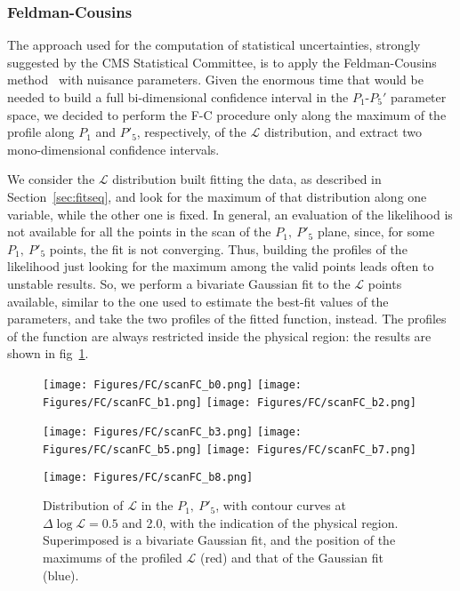 

\subsubsection{Feldman-Cousins}
The approach used for the computation of statistical uncertainties, strongly suggested by the CMS Statistical Committee, is to apply the Feldman-Cousins method~\cite{FC} with nuisance parameters.
Given the enormous time that would be needed to build a full bi-dimensional confidence interval in the $P_1$-$P_5'$ parameter space, we decided to perform the F-C procedure only along the maximum of the profile along $P_1$ and $P'_5$, respectively, of the $\mathcal{L}$ distribution, and extract two mono-dimensional confidence intervals.

We consider the $\mathcal{L}$ distribution built fitting the data, as described in Section~\ref{sec:fitseq}, and look for the maximum of that distribution along one variable, while the other one is fixed.
In general, an evaluation of the likelihood is not available for all the points in the scan of the $P_1,~P'_5$ plane, since, for some $P_1,~P'_5$ points, the fit is not converging.
Thus, building the profiles of the likelihood just looking for the maximum among the valid points leads often to unstable results.
So, we perform a bivariate Gaussian fit to the $\mathcal{L}$ points available, similar to the one used to estimate the best-fit values of the parameters, and take the two profiles of the fitted function, instead.
The profiles of the function are always restricted inside the physical region: the results are shown in fig~\ref{fig:profileL}.

\begin{figure}
  \centering
  \texttt{[image: Figures/FC/scanFC\_b0.png]}
  \texttt{[image: Figures/FC/scanFC\_b1.png]}
  \texttt{[image: Figures/FC/scanFC\_b2.png]}

  \texttt{[image: Figures/FC/scanFC\_b3.png]}
  \texttt{[image: Figures/FC/scanFC\_b5.png]}
  \texttt{[image: Figures/FC/scanFC\_b7.png]}

  \texttt{[image: Figures/FC/scanFC\_b8.png]}
  \caption{Distribution of $\mathcal{L}$ in the $P_1,~P'_5$, with contour curves at $\Delta\log{\mathcal{L}}=0.5$ and 2.0, with the indication of the physical region.
    Superimposed is a bivariate Gaussian fit, and the position of the maximums of the profiled $\mathcal{L}$ (red) and that of the Gaussian fit (blue).}
  \label{fig:profileL}
\end{figure}

